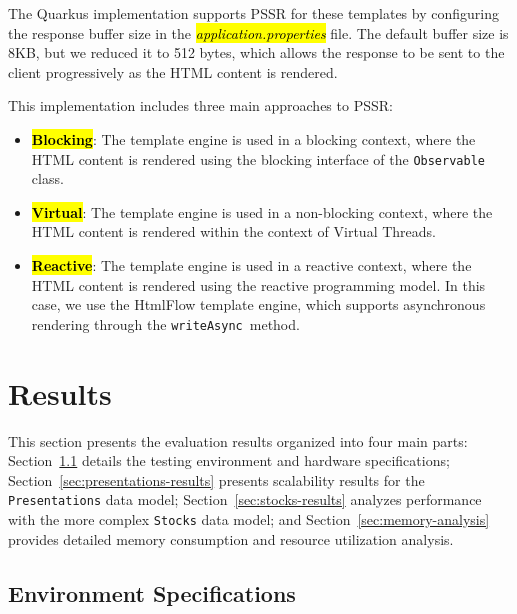 \documentclass[software,article,accept,pdftex,moreauthors]{Definitions/mdpi}
\begin{document}
The Quarkus implementation supports PSSR for these templates by configuring the
response buffer size in the \textit{\hl{application.properties}} file. The default
buffer size is 8KB, but we reduced it to 512 bytes, which allows the response
to be sent to the client progressively as the HTML content is rendered.

This implementation includes three main approaches to PSSR\@:
\begin{itemize}
      \item \textbf{\hl{Blocking}}: The template engine is used in a blocking context,
            where the HTML content is rendered using the blocking interface of the
            \texttt{Observable} class.
      \item \textbf{\hl{Virtual}}: The template engine is used in a non-blocking context,
            where the HTML content is rendered within the context of Virtual Threads.
      \item \textbf{\hl{Reactive}}: The template engine is used in a reactive context,
            where the HTML content is rendered using the reactive programming model.
            In this case, we use the HtmlFlow template engine, which
            supports asynchronous rendering through the \texttt{writeAsync}~method.
\end{itemize}


\section{Results}\label{s5}

This section presents the evaluation results organized into four main parts:
Section~\ref{sec:environment} details the testing environment and hardware
specifications; Section~\ref{sec:presentations-results} presents scalability
results for the \texttt{Presentations} data model;
Section~\ref{sec:stocks-results} analyzes performance with the more complex
\texttt{Stocks} data model; and Section~\ref{sec:memory-analysis} provides
detailed memory consumption and resource utilization analysis.

\subsection{Environment Specifications}
\label{sec:environment}
\end{document}
